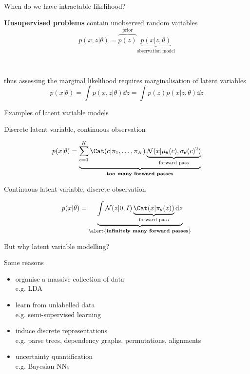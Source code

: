\documentclass[14pt]{beamer}
\begin{document}
\begin{frame}{When do we have intractable likelihood?}

{\bf Unsupervised problems} contain unobserved random variables\\ 
\begin{equation*}
p(x, z|\theta) = \overbrace{p(z)}^{\text{prior}} \underbrace{p(x|z, \theta)}_{\text{observation model}}
\end{equation*}

~ \pause

thus assessing the marginal likelihood requires \alert{marginalisation of latent variables} 
\begin{equation*}
p(x|\theta) = \int p(x, z|\theta) \dd{z} = \int p(z)p(x|z, \theta) \dd{z} 
\end{equation*}

\end{frame}


\begin{frame}{Examples of latent variable models}

Discrete latent variable, continuous observation
	\begin{small}
	\begin{equation*}
	p(x|\theta) = \underbrace{\sum_{c=1}^K \Cat(c|\pi_1, \ldots, \pi_K) \underbrace{\mathcal N(x|\mu_\theta(c), \sigma_\theta(c)^2)}_{\text{forward pass}}}_{\text{{\bf too many forward passes}}}
	\end{equation*}
	\end{small} 

	\pause
	
Continuous latent variable, discrete observation
	\begin{small}
	\begin{equation*}
	p(x|\theta) = \underbrace{\int \mathcal N(z|0, I) \underbrace{\Cat(x|\pi_\theta(z))}_{\text{forward pass}} \mathrm{d}z }_{\text{\alert{{\bf infinitely many forward passes}}}}
	\end{equation*}
	\end{small}

\end{frame}


\begin{frame}{But why latent variable modelling?}

Some reasons

\begin{itemize}
	\item organise a massive collection of data\\
	e.g. LDA	 \pause
	\item learn from unlabelled data\\
	e.g. semi-supervised learning \pause
	\item induce discrete representations\\
	e.g. parse trees, dependency graphs, permutations, alignments \pause
	\item uncertainty quantification\\
	e.g. Bayesian NNs 
\end{itemize}

\end{frame}
\end{document}
